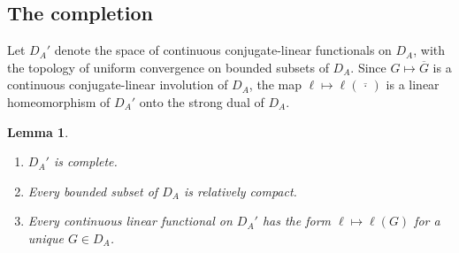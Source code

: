 \documentclass[11pt]{amsart}
\newtheorem{lemma}[theorem]{Lemma}
\theoremstyle{definition}
\theoremstyle{remark}
\newcommand{\DA}{D_A}
\begin{document}
\subsection{The completion}

Let $\DA'$ denote the space of continuous conjugate-linear functionals on
$\DA$, with the topology of uniform convergence on bounded subsets of $\DA$.
Since $G\mapsto\overline G$ is a continuous conjugate-linear involution of
$\DA$, the map $\ell\mapsto\ell(\overline{\,\cdot\,})$ is a linear
homeomorphism of $\DA'$ onto the strong dual of $\DA$.

\begin{lemma}\label{lem:reflexive}
\begin{enumerate}
\item[(a)] $\DA'$ is complete.
\item[(b)] Every bounded subset of $\DA$ is relatively compact.
\item[(c)] Every continuous linear functional on $\DA'$ has the form
$\ell\mapsto\ell(G)$ for a unique $G\in\DA$.
\end{enumerate}
\end{lemma}
\end{document}
